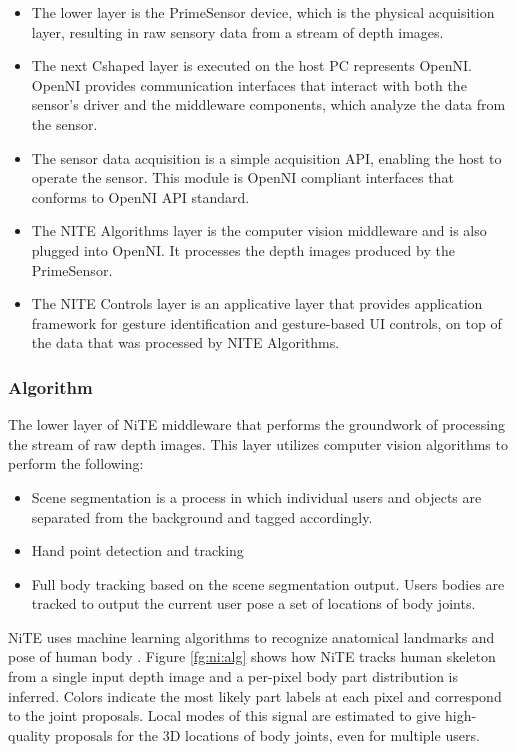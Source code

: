 
\begin{itemize}
	\item The lower layer is the PrimeSensor device, which is the physical acquisition layer, resulting in raw sensory data from a stream of depth images. 
	\item The next Cshaped layer is executed on the host PC represents OpenNI. OpenNI provides communication interfaces that interact with both the sensor's driver and the middleware components, which analyze the data from the sensor. 
	\item The sensor data acquisition is a simple acquisition API, enabling the host to operate the sensor. This module is OpenNI compliant interfaces that conforms to OpenNI API standard. 
	\item The NITE Algorithms layer is the computer vision middleware and is also plugged into OpenNI. It processes the depth images produced by the PrimeSensor. 
	\item The NITE Controls layer is an applicative layer that provides application framework for gesture identification and gesture-based UI controls, on top of the data that was processed by NITE Algorithms. 
\end{itemize}

\subsubsection{Algorithm} The lower layer of NiTE middleware that performs the groundwork of processing the stream of raw depth images. This layer utilizes computer vision algorithms to perform the following: 
\begin{itemize}
	\item Scene segmentation is a process in which individual users and objects are separated from the background and tagged accordingly. 
	\item Hand point detection and tracking 
	\item Full body tracking based on the scene segmentation output. Users bodies are tracked to output the current user pose a set of locations of body joints. 
\end{itemize}

NiTE uses machine learning algorithms to recognize anatomical landmarks and pose of human body \cite{}. Figure \ref{fg:ni:alg} shows how NiTE tracks human skeleton from a single input depth image and a per-pixel body part distribution is inferred. Colors indicate the most likely part labels at each pixel and correspond to the joint proposals. Local modes of this signal are estimated to give high-quality proposals for the 3D locations of body joints, even for multiple users.

